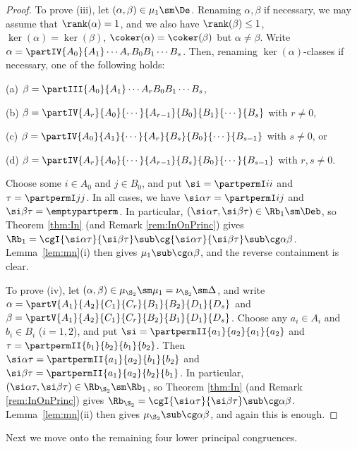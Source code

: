 \begin{proof}
To prove (iii), let $(\alpha,\beta)\in\mu_1\sm\De$.
Renaming $\alpha,\beta$ if necessary, we may assume that $\rank(\alpha)=1$, and we also have $\rank(\beta)\leq1$, $\ker(\alpha)=\ker(\beta)$, $\coker(\alpha)=\coker(\beta)$ but $\alpha\not=\beta$.  Write $\alpha=\partIV{A_0}{A_1}\cdots{A_r}{B_0}{B_1}\cdots{B_s}$.  Then, renaming $\ker(\alpha)$-classes if necessary, one of the following holds:
\begin{itemize}\begin{multicols}{2}
\item[(a)] $\beta=\partIII{A_0}{A_1}\cdots{A_r}{B_0}{B_1}\cdots{B_s}$,
\item[(b)] $\beta = \partIV{A_r}{A_0}{\cdots}{A_{r-1}}{B_0}{B_1}{\cdots}{B_s}$ with $r\not=0$, 
\item[(c)] $\beta = \partIV{A_0}{A_1}{\cdots}{A_r}{B_s}{B_0}{\cdots}{B_{s-1}}$ with $s\not=0$, or
\item[(d)] $\beta = \partIV{A_r}{A_0}{\cdots}{A_{r-1}}{B_s}{B_0}{\cdots}{B_{s-1}}$ with $r,s\not=0$.
\end{multicols}\end{itemize}
Choose some $i\in A_0$ and $j\in B_0$, and put $\si=\partpermI ii$ and $\tau=\partpermI jj$.  In all cases, we have $\si\alpha\tau=\partpermI ij$ and $\si\beta\tau = \emptypartperm$.  In particular, $(\si\alpha\tau,\si\beta\tau)\in\Rb_1\sm\Deb$, so Theorem \ref{thm:In} (and Remark \ref{rem:InOnPrinc}) gives $\Rb_1=\cgI{\si\alpha\tau}{\si\beta\tau}\sub\cg{\si\alpha\tau}{\si\beta\tau}\sub\cg\alpha\beta$.  Lemma~\ref{lem:mn}(i) then gives $\mu_1\sub\cg\alpha\beta$, and the reverse containment is clear.

To prove (iv), let $(\alpha,\beta)\in\mu_{\S_2}\sm\mu_1=\nu_{\S_2}\sm\Delta$, and write $\alpha=\partV{A_1}{A_2}{C_1}{C_r}{B_1}{B_2}{D_1}{D_s}$ and $\beta=\partV{A_1}{A_2}{C_1}{C_r}{B_2}{B_1}{D_1}{D_s}$.  Choose any $a_i\in A_i$ and $b_i\in B_i$ ($i=1,2$), and put $\si=\partpermII{a_1}{a_2}{a_1}{a_2}$ and $\tau=\partpermII{b_1}{b_2}{b_1}{b_2}$.  Then $\si\alpha\tau=\partpermII{a_1}{a_2}{b_1}{b_2}$ and $\si\beta\tau=\partpermII{a_1}{a_2}{b_2}{b_1}$.  In particular, $(\si\alpha\tau,\si\beta\tau)\in\Rb_{\S_2}\sm\Rb_1$, so Theorem \ref{thm:In} (and Remark \ref{rem:InOnPrinc}) gives $\Rb_{\S_2}=\cgI{\si\alpha\tau}{\si\beta\tau}\sub\cg\alpha\beta$.  Lemma~\ref{lem:mn}(ii) then gives $\mu_{\S_2}\sub\cg\alpha\beta$, and again this is enough.  \end{proof}

Next we move onto the remaining four lower principal congruences.


